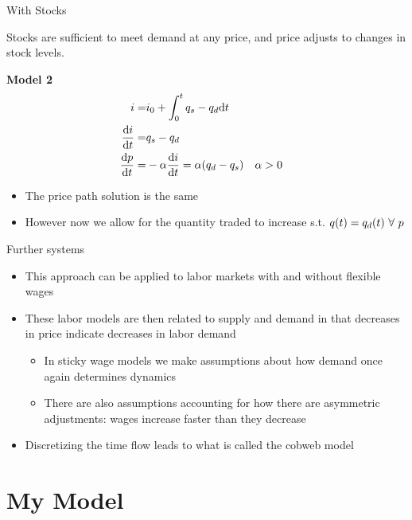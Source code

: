 \documentclass{article}
\begin{document}
With Stocks
	\begin{assumption}
		Stocks are sufficient to meet demand at any price, and price adjusts to changes in stock levels.
	\end{assumption}
	\textbf{Model 2}
	\begin{align*}
		i =& i_0 + \int_0^t{q_s - q_d}\mathrm{d} t\\
		\frac{\mathrm{d} i}{\mathrm{d} t} = & q_s - q_d \\
		\frac{\mathrm{d} p}{\mathrm{d} t} =& -\alpha\frac{\mathrm{d} i}{\mathrm{d} t} = \alpha(q_d - q_s) && \alpha > 0
	\end{align*}	
	\begin{itemize}
		\item The price path solution is the same
		\item However now we allow for the quantity traded to increase s.t. $q(t) = q_d(t)\ \forall\ p$
	\end{itemize}

Further systems
	\begin{itemize}
		\item This approach can be applied to labor markets with and without flexible wages
		\item These labor models are then related to supply and demand in that decreases in price indicate decreases in labor demand
		\begin{itemize}
			\item In sticky wage models we make assumptions about how demand once again determines dynamics
			\item There are also assumptions accounting for how there are asymmetric adjustments: wages increase faster than they decrease
		\end{itemize}
		\item Discretizing the time flow leads to what is called the cobweb model
	\end{itemize}


\section{My Model}
\end{document}
